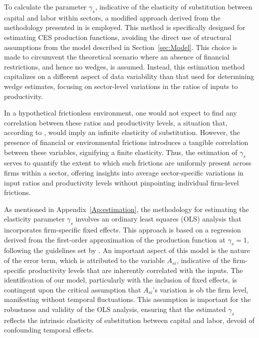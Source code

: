 To calculate the parameter $\gamma_s$, indicative of the elasticity of substitution between capital and labor within sectors, a modified approach derived from the methodology presented in \cite{kmenta1967estimation} is employed. This method is specifically designed for estimating CES production functions, avoiding the direct use of structural assumptions from the model described in Section~\ref{sec:Model}. This choice is made to circumvent the theoretical scenario where an absence of financial restrictions, and hence no wedges, is assumed. Instead, this estimation method capitalizes on a different aspect of data variability than that used for determining wedge estimates, focusing on sector-level variations in the ratios of inputs to productivity.

In a hypothetical frictionless environment, one would not expect to find any correlation between these ratios and productivity levels, a situation that, according to \cite{kmenta1967estimation}, would imply an infinite elasticity of substitution. However, the presence of financial or environmental frictions introduces a tangible correlation between these variables, signifying a finite elasticity. Thus, the estimation of $\gamma_s$ serves to quantify the extent to which such frictions are uniformly present across firms within a sector, offering insights into average sector-specific variations in input ratios and productivity levels without pinpointing individual firm-level frictions.

As mentioned in Appendix~\ref{Ap:estimation}, the methodology for estimating the elasticity parameter $\gamma_s$ involves an ordinary least squares (OLS) analysis that incorporates firm-specific fixed effects. This approach is based on a regression derived from the first-order approximation of the production function at $\gamma_s = 1$, following the guidelines set by \cite{kmenta1967estimation}. An important aspect of this model is the nature of the error term, which is attributed to the variable $A_{si}$, indicative of the firm-specific productivity levels that are inherently correlated with the inputs. The identification of our model, particularly with the inclusion of fixed effects, is contingent upon the critical assumption that $A_{si}$'s variation is ob the firm level, manifesting without temporal fluctuations. This assumption is important for the robustness and validity of the OLS analysis, ensuring that the estimated $\gamma_s$ reflects the intrinsic elasticity of substitution between capital and labor, devoid of confounding temporal effects.

